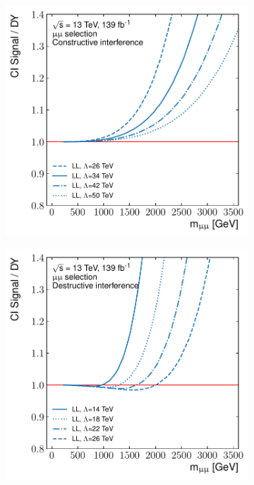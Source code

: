 \begin{figure}[]
\begin{subfigure}[b]{0.49\textwidth}
        \caption{}
        \label{fig:datamc:sigShape2}
    \end{subfigure}
    \begin{subfigure}[b]{0.49\textwidth}
        \centering
        \includegraphics[width=\textwidth]{figures/analysis/datamc/sigmodel/fit-const-mm-backgroundModel.pdf}
        \caption{}
        \label{fig:datamc:sigShape3}
    \end{subfigure}
    \begin{subfigure}[b]{0.49\textwidth}
        \centering
        \includegraphics[width=\textwidth]{figures/analysis/datamc/sigmodel/fit-dest-mm-backgroundModel.pdf}

\end{subfigure}
\end{figure}
